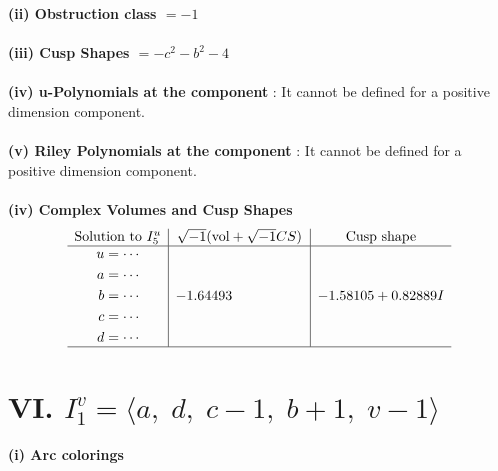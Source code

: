 \documentclass[1p]{elsarticle_modified}
\theoremstyle{definition}
\newcommand{\I}{\sqrt{-1}}
\begin{document}
\flushleft \textbf{(ii) Obstruction class $= -1$}\\~\\
\flushleft \textbf{(iii) Cusp Shapes $= - c^2- b^2-4$}\\~\\
\flushleft \textbf{(iv) u-Polynomials at the component} : It cannot be defined for a positive dimension component.\\~\\
\flushleft \textbf{(v) Riley Polynomials at the component} : It cannot be defined for a positive dimension component.\\~\\
\newpage\flushleft \textbf{(iv) Complex Volumes and Cusp Shapes}
$$\begin{array}{c|c|c} 
\text{Solution to }I^u_{5}& \I (\text{vol} + \sqrt{-1}CS) & \text{Cusp shape}\\
 \hline 
\begin{aligned}
u &= \cdots \\
a &= \cdots \\
b &= \cdots \\
c &= \cdots \\
d &= \cdots\end{aligned}
 & -1.64493\phantom{ +0.000000I} & -1.58105 + 0.82889 I\\
 \hline 
 \end{array}
$$\newpage\renewcommand{\arraystretch}{1}
\centering \section*{VI. $I^v_{1}= \langle a,\;d,\;c-1,\;b+1,\;v-1 \rangle$}
\flushleft \textbf{(i) Arc colorings}\\
\end{document}
